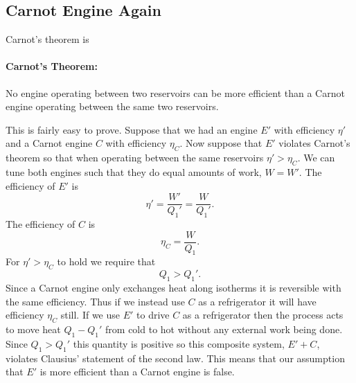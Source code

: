     \subsection{Carnot Engine Again}
    Carnot's theorem is
    \paragraph{Carnot's Theorem:} No engine operating between two reservoirs can be more efficient than a Carnot engine operating between the same two reservoirs.
    
    This is fairly easy to prove.
    Suppose that we had an engine \(E'\) with efficiency \(\eta'\) and a Carnot engine \(C\) with efficiency \(\eta_C\).
    Now suppose that \(E'\) violates Carnot's theorem so that when operating between the same reservoirs \(\eta' > \eta_C\).
    We can tune both engines such that they do equal amounts of work, \(W = W'\).
    The efficiency of \(E'\) is
    \[\eta' = \frac{W'}{Q_1'} = \frac{W}{Q_1'}.\]
    The efficiency of \(C\) is
    \[\eta_C = \frac{W}{Q_1}.\]
    For \(\eta' > \eta_C\) to hold we require that
    \[Q_1 > Q_1'.\]
    Since a Carnot engine only exchanges heat along isotherms it is reversible with the same efficiency.
    Thus if we instead use \(C\) as a refrigerator it will have efficiency \(\eta_C\) still.
    If we use \(E'\) to drive \(C\) as a refrigerator then the process acts to move heat \(Q_1 - Q_1'\) from cold to hot without any external work being done.
    Since \(Q_1 > Q_1'\) this quantity is positive so this composite system, \(E' + C\), violates Clausius' statement of the second law.
    This means that our assumption that \(E'\) is more efficient than a Carnot engine is false.
    

